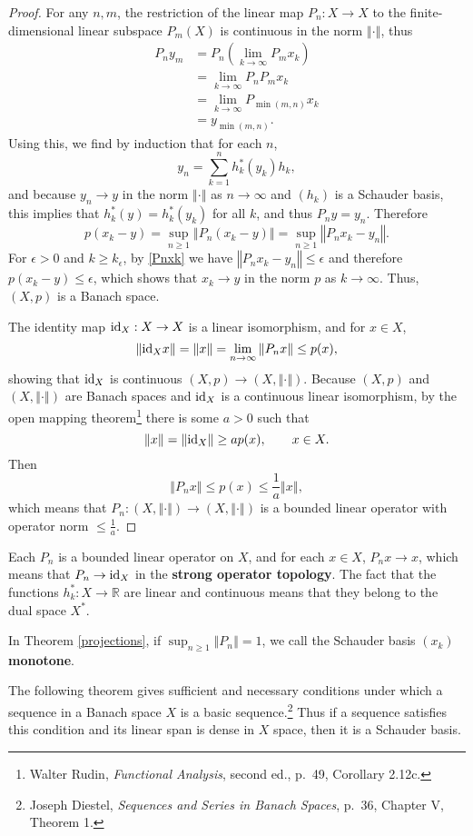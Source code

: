 \documentclass{article}
\newcommand{\id}{\ensuremath\mathrm{id}}
\newcommand{\norm}[1]{\left\Vert #1 \right\Vert}
\theoremstyle{definition}
\theoremstyle{definition}
\begin{document}
\begin{proof}
For any $n,m$, the restriction of the linear map $P_n:X \to X$ to the finite-dimensional linear subspace $P_m(X)$ is
continuous in the norm $\norm{\cdot}$,
thus
\begin{align*}
P_n y_m &=P_n\left( \lim_{k \to \infty} P_m x_k\right)\\
&=\lim_{k \to \infty} P_n P_m x_k\\
&=\lim_{k \to \infty} P_{\min(m,n)} x_k\\
&=y_{\min(m,n)}.
\end{align*}
Using this, we find by induction that for each $n$,
\[
y_n = \sum_{k=1}^n h_k^*(y_k) h_k,
\]
and because $y_n \to y$ in the norm $\norm{\cdot}$ as $n \to \infty$ and $(h_k)$ is a Schauder basis,
this implies that $h_k^*(y)=h_k^*(y_k)$ for all $k$, and thus $P_n y=y_n$. 
Therefore
\[
p(x_k-y) = \sup_{n \geq 1} \norm{P_n(x_k-y)}
= \sup_{n \geq 1} \norm{P_n x_k-y_n}.
\]
For $\epsilon>0$ and $k \geq k_\epsilon$, by \eqref{Pnxk} we have $\norm{P_n x_k-y_n} \leq \epsilon$
and therefore
$p(x_k-y) \leq \epsilon$, which shows that $x_k \to y$ in the norm $p$ as $k \to \infty$. Thus,
$(X,p)$ is a Banach space. 

The identity map $\id_X:X \to X$ is a linear isomorphism, and
for $x \in X$,
\[
\norm{\id_X x} = \norm{x} = \lim_{n \to \infty} \norm{P_n x}
\leq p(x),
\]
showing that $\id_X$ is continuous $(X,p) \to (X,\norm{\cdot})$. 
Because $(X,p)$ and $(X,\norm{\cdot})$ are Banach spaces and
$\id_X$ is a continuous linear isomorphism, by the open mapping theorem\footnote{Walter Rudin,
{\em Functional Analysis}, second ed., p.~49, Corollary 2.12c.}
there is some $a>0$ such that
\[
\norm{x}=\norm{\id_X} \geq ap(x),\qquad x \in X.
\]
Then
\[
\norm{P_n x} \leq p(x) \leq \frac{1}{a} \norm{x},
\]
which means that $P_n:(X,\norm{\cdot}) \to (X,\norm{\cdot})$ is a bounded linear operator with
operator norm $\leq \frac{1}{a}$. 
\end{proof}

Each $P_n$ is a bounded linear operator on $X$, and for each $x \in X$, $P_nx \to x$, which means
that $P_n \to \id_X$ in the \textbf{strong operator topology}. 
The fact that the functions $h_k^*:X \to \mathbb{R}$ are linear and continuous means that they belong to the dual
space
$X^*$. 

In Theorem \ref{projections}, if $\sup_{n \geq 1} \norm{P_n}=1$, we call the Schauder basis $(x_k)$  \textbf{monotone}. 



The following theorem gives sufficient and necessary conditions under which a sequence in a Banach space $X$ is a basic sequence.\footnote{Joseph Diestel, {\em Sequences and Series in Banach Spaces}, p.~36, Chapter V, Theorem 1.} Thus if a sequence satisfies this condition and its linear span is dense in $X$
space, then it is a Schauder basis.
\end{document}
